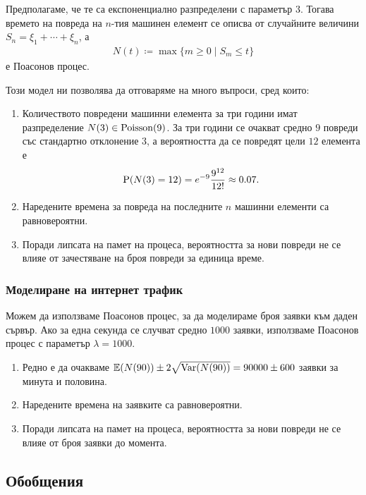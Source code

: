 \documentclass[numbers=endperiod, bibliography=totocnumbered]{scrartcl}
\begin{document}
Предполагаме, че те са експоненциално разпределени с параметър \( 3 \). Тогава времето на повреда на \( n \)-тия машинен елемент се описва от случайните величини \( S_n = \xi_1 + \cdots + \xi_n \), а
\begin{align*}
  N(t) \coloneqq \max \{ m \geq 0 \mid S_m \leq t \}
\end{align*}
е Поасонов процес.

Този модел ни позволява да отговаряме на много въпроси, сред които:
\begin{enumerate}
  \item Количеството повредени машинни елемента за три години имат разпределение \( N(3) \in \operatorname{Poisson}(9) \). За три години се очакват средно \( 9 \) повреди със стандартно отклонение \( 3 \), а вероятността да се повредят цели \( 12 \) елемента е
  \begin{align*}
    \operatorname{P}(N(3) = 12) = e^{-9} \frac {9^{12}} {12!} \approx 0.07.
  \end{align*}

  \item Наредените времена за повреда на последните \( n \) машинни елементи са равновероятни.
  \item Поради липсата на памет на процеса, вероятността за нови повреди не се влияе от зачестяване на броя повреди за единица време.
\end{enumerate}

\subsubsection{Моделиране на интернет трафик}

Можем да използваме Поасонов процес, за да моделираме броя заявки към даден сървър. Ако за една секунда се случват средно \( 1000 \) заявки, използваме Поасонов процес с параметър \( \lambda = 1000 \).
\begin{enumerate}
  \item Редно е да очакваме \( \mathbb{E}(N(90)) \pm 2\sqrt{\operatorname{Var}(N(90))} = 90000 \pm 600 \) заявки за минута и половина.
  \item Наредените времена на заявките са равновероятни.
  \item Поради липсата на памет на процеса, вероятността за нови повреди не се влияе от броя заявки до момента.
\end{enumerate}

\subsection{Обобщения}
\end{document}
